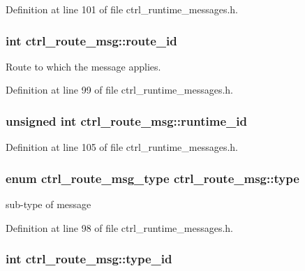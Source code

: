 Definition at line 101 of file ctrl\-\_\-runtime\-\_\-messages.\-h.

\hypertarget{structctrl__route__msg_ace2981a09919332eb535700c18e4ab19}{
\subsubsection[{route\-\_\-id}]{\setlength{\rightskip}{0pt plus 5cm}int ctrl\-\_\-route\-\_\-msg\-::route\-\_\-id}}\label{structctrl__route__msg_ace2981a09919332eb535700c18e4ab19}


Route to which the message applies. 



Definition at line 99 of file ctrl\-\_\-runtime\-\_\-messages.\-h.

\hypertarget{structctrl__route__msg_a87e6c3090932650f56352dd97b5089b3}{
\subsubsection[{runtime\-\_\-id}]{\setlength{\rightskip}{0pt plus 5cm}unsigned int ctrl\-\_\-route\-\_\-msg\-::runtime\-\_\-id}}\label{structctrl__route__msg_a87e6c3090932650f56352dd97b5089b3}


Definition at line 105 of file ctrl\-\_\-runtime\-\_\-messages.\-h.

\hypertarget{structctrl__route__msg_aa809d7c9ee772df20d285e8da7d71849}{
\subsubsection[{type}]{\setlength{\rightskip}{0pt plus 5cm}enum {\bf ctrl\-\_\-route\-\_\-msg\-\_\-type} ctrl\-\_\-route\-\_\-msg\-::type}}\label{structctrl__route__msg_aa809d7c9ee772df20d285e8da7d71849}


sub-\/type of message 



Definition at line 98 of file ctrl\-\_\-runtime\-\_\-messages.\-h.

\hypertarget{structctrl__route__msg_a3b818d3acb7a45f6e32a70d0ebfe0449}{
\subsubsection[{type\-\_\-id}]{\setlength{\rightskip}{0pt plus 5cm}int ctrl\-\_\-route\-\_\-msg\-::type\-\_\-id}}\label{structctrl__route__msg_a3b818d3acb7a45f6e32a70d0ebfe0449}



